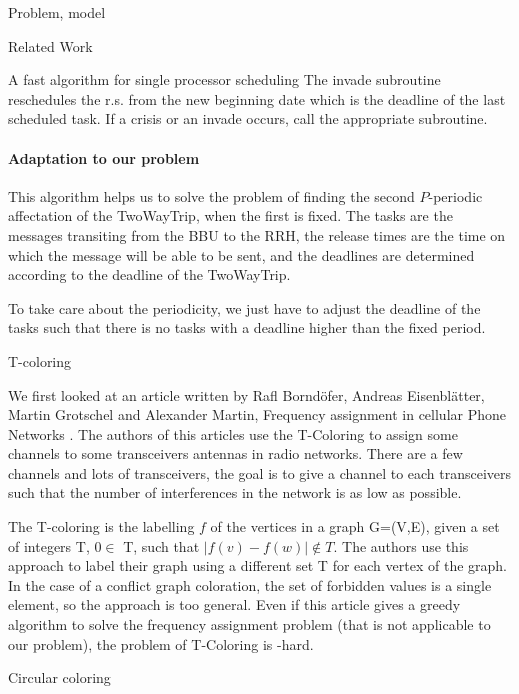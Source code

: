 \documentclass[a4paper,10pt]{report}
\begin{document}
\begin{chapter}{Problem, model}
\begin{section}{Related Work}
\begin{subsection}{A fast algorithm for single processor scheduling}
The invade subroutine reschedules the r.s. from the new beginning date which is the deadline of the last scheduled task. If a crisis or an invade occurs,
call the appropriate subroutine.

\paragraph{Adaptation to our problem}
This algorithm helps us to solve the problem of finding the second $P$-periodic affectation of the TwoWayTrip, when the first is fixed. 
The tasks are the messages transiting from the BBU to the RRH, the release times are the time on which the message will be able to be sent,
and the deadlines are determined according to the deadline of the TwoWayTrip.

To take care about the periodicity, we just have to adjust the deadline of the tasks such that there is no tasks with a deadline 
higher than the fixed period.

\end{subsection}


\begin{subsection}{T-coloring}


 We first looked at an article written by Rafl Borndöfer, Andreas Eisenblätter, Martin Grotschel and Alexander Martin, Frequency assignment
 in cellular Phone Networks \cite{borndorfer1998frequency}. The authors of this articles use the T-Coloring to assign some channels to some 
 transceivers antennas in radio networks. There are a few channels and lots of transceivers, the goal is to give a channel to each transceivers
 such that the number of interferences in the network is as low as possible.
 
 The T-coloring is the labelling $f$ of the vertices in a graph G=(V,E), given a set of integers T, $0 \in$ T, such that 
 $|f(v) - f(w)| \notin T$.
 The authors use this approach to label their graph using a different set T for each vertex of the graph.
 In the case of a conflict graph coloration, the set of forbidden values is a single element, so the approach is too general.
 Even if this article gives a greedy algorithm to solve the frequency assignment problem (that is not applicable to our problem), the problem of T-Coloring is \NP-hard.

\end{subsection}
\begin{subsection}{Circular coloring}


\end{subsection}
\end{section}
\end{chapter}
\end{document}
